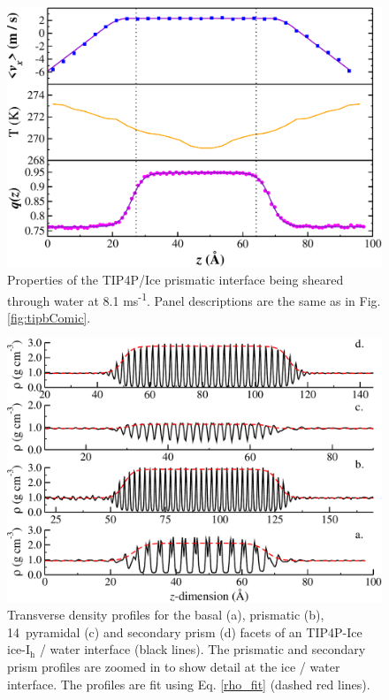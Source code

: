 \begin{figure}
\includegraphics[width=\linewidth]{Figures/Pyra_TIP4PIce_Plot}
\caption{\label{fig:tippyComic} Properties of the TIP4P/Ice prismatic
  interface being sheared through water at 8.1 ms\textsuperscript{-1}.
  Panel descriptions are the same as in Fig. \ref{fig:tipbComic}.}
\end{figure}


\begin{figure}
\includegraphics[width=\linewidth]{Figures/TIPtransDensity}
\caption{\label{fig:TIPtransDensity} Transverse density profiles for the
  basal (a), prismatic (b), 14\degree~pyramidal (c) and secondary prism (d)
  facets of an TIP4P-Ice ice-I$_\mathrm{h}$ / water interface (black
  lines). The prismatic and secondary prism profiles are zoomed in to
  show detail at the ice / water interface. The profiles are fit using
  Eq. \eqref{rho_fit} (dashed red lines). }
\end{figure}